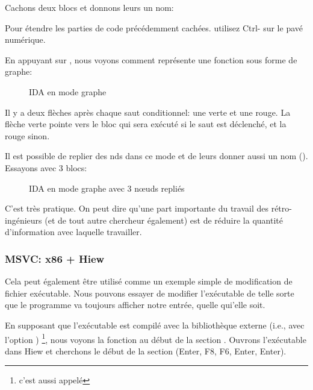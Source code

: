 Cachons deux blocs et donnons leurs un nom:



Pour étendre les parties de code précédemment cachées. utilisez Ctrl-\q{+} sur le
pavé numérique.

\clearpage
En appuyant sur , nous voyons comment \IDA représente une fonction sous
forme de graphe:

\begin{figure}[H]
\centering
{}
\caption{IDA en mode graphe}
\label{fig:ex3_IDA_1}
\end{figure}

Il y a deux flèches après chaque saut conditionnel: une verte et une rouge.
La flèche verte pointe vers le bloc qui sera exécuté si le saut est déclenché,
et la rouge sinon.

\clearpage
Il est possible de replier des nds dans ce mode et de leurs donner aussi un nom ().
Essayons avec 3 blocs:

\begin{figure}[H]
\centering
{}
\caption{IDA en mode graphe avec 3 nœuds repliés}
\label{fig:ex3_IDA_2}
\end{figure}

C'est très pratique.
On peut dire qu'une part importante du travail des rétro-ingénieurs (et de tout
autre chercheur également) est de réduire la quantité d'information avec laquelle
travailler.



\clearpage
\subsubsection{MSVC: x86 + Hiew}

Cela peut également être utilisé comme un exemple simple de modification de fichier
exécutable.
Nous pouvons essayer de modifier l'exécutable de telle sorte que le programme va
toujours afficher notre entrée, quelle qui'elle soit.

En supposant que l'exécutable est compilé avec la bibliothèque externe 
(i.e., avec l'option ) \footnote{c'est aussi appelé },
nous voyons la fonction \main au début de la section .
Ouvrons l'exécutable dans Hiew et cherchons le début de la section  (Enter,
F8, F6, Enter, Enter).

